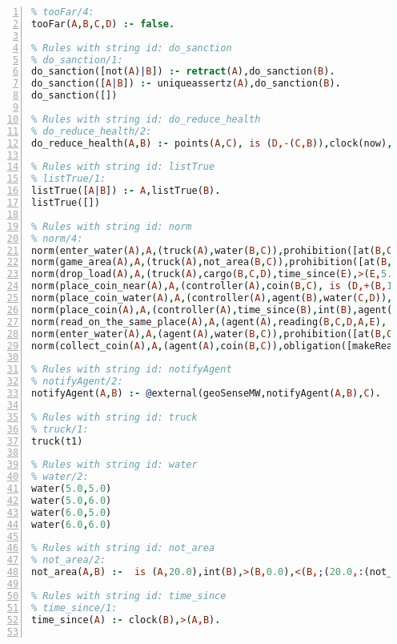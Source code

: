 \documentclass[11pt]{article}\usepackage[utf8]{inputenc}\usepackage{geometry}
\begin{document}
\lstset{breaklines=true}\begin{lstlisting}[language=Prolog, numbers=left]
% Rules with string id: tooFar
% tooFar/4:
tooFar(A,B,C,D) :- false.

% Rules with string id: do_sanction
% do_sanction/1:
do_sanction([not(A)|B]) :- retract(A),do_sanction(B).
do_sanction([A|B]) :- uniqueassertz(A),do_sanction(B).
do_sanction([])

% Rules with string id: do_reduce_health
% do_reduce_health/2:
do_reduce_health(A,B) :- points(A,C), is (D,-(C,B)),clock(now),@external(geoSenseMW,write(points(A,E,D),-1.0),F).

% Rules with string id: listTrue
% listTrue/1:
listTrue([A|B]) :- A,listTrue(B).
listTrue([])

% Rules with string id: norm
% norm/4:
norm(enter_water(A),A,(truck(A),water(B,C)),prohibition([at(B,C,A)|[]],[reduce(A,300.0)|[]]))
norm(game_area(A),A,(truck(A),not_area(B,C)),prohibition([at(B,C,A)|[]],[reduce(A,500.0)|[]]))
norm(drop_load(A),A,(truck(A),cargo(B,C,D),time_since(E),>(E,5.0)),obligation([cargo(E)|[]],+(now,15.0),[reduce(A,400.0)|[]]))
norm(place_coin_near(A),A,(controller(A),coin(B,C), is (D,+(B,1.0)), is (E,+(C,1.0)),gameArea(B,C)),prohibition([coin(D,E)|[]],[reduce(A,200.0)|[]]))
norm(place_coin_water(A),A,(controller(A),agent(B),water(C,D)),prohibition([coin(C,D,B)|[]],[reduce(A,300.0)|[]]))
norm(place_coin(A),A,(controller(A),time_since(B),int(B),agent(C)),obligation([coin(C)|[]],+(now,15.0),[reduce(A,100.0)|[]]))
norm(read_on_the_same_place(A),A,(agent(A),reading(B,C,D,A,E), is (F,+(E,1.0))),prohibition([reading(B,C,A)|[]],[reduce(A,300.0)|[]]))
norm(enter_water(A),A,(agent(A),water(B,C)),prohibition([at(B,C,A)|[]],[reduce(A,300.0)|[]]))
norm(collect_coin(A),A,(agent(A),coin(B,C)),obligation([makeReading(B,C)|[]],+(now,15.0),[reduce(A,400.0)|[]]))

% Rules with string id: notifyAgent
% notifyAgent/2:
notifyAgent(A,B) :- @external(geoSenseMW,notifyAgent(A,B),C).

% Rules with string id: truck
% truck/1:
truck(t1)

% Rules with string id: water
% water/2:
water(5.0,5.0)
water(5.0,6.0)
water(6.0,5.0)
water(6.0,6.0)

% Rules with string id: not_area
% not_area/2:
not_area(A,B) :-  is (A,20.0),int(B),>(B,0.0),<(B,;(20.0,:(not_area(A,B), is (-(B),20.0)))),int(A),>(A,0.0),<(A,;(20.0,:(area(A,B),-(int(A))))),int(B),>(A,0.0),>(B,0.0),<(A,21.0),<(B,21.0).

% Rules with string id: time_since
% time_since/1:
time_since(A) :- clock(B),>(A,B).


\end{lstlisting}
\end{document}

